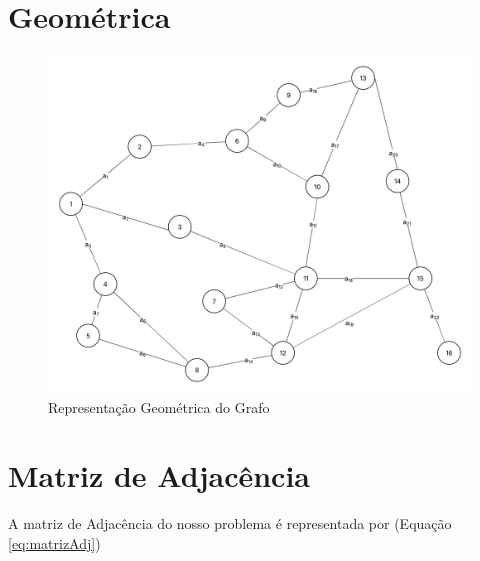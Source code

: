\section{Geométrica}\label{sec:geometrica}
\begin{figure}[!htb]%
	\caption{Representação Geométrica do Grafo}%
	\label{fig:grafGeometrico}%
	\includegraphics[width=1\textwidth,angle=0]{figuras/grafoGeometrico.png}%
\end{figure}


\section{Matriz de Adjacência}\label{sec:matriz}

A matriz de Adjacência do nosso problema é representada por (Equação \ref{eq:matrizAdj})


